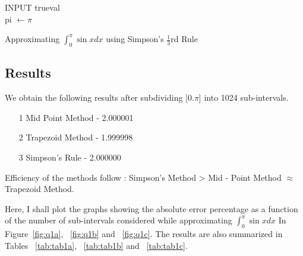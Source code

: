 \documentclass[titlepage, 11pt]{article}
\begin{document}
\begin{center}
\begin{algorithm}[H]\label{alg3}

\SetAlgoLined

INPUT trueval \\ 
pi $\gets \pi$ \\

 \caption{Approximating  $\int_{0}^{\pi} \sin{x} dx$ using Simpson's $\frac{1}{3}$rd Rule}
\end{algorithm}    
\end{center}

\subsection{Results}

We obtain the following results after subdividing [0.$\pi$] into 1024 sub-intervals. 
\begin{itemize}
    \item [1] Mid Point Method - 2.000001
    \item [2] Trapezoid Method - 1.999998
    \item [3] Simpson's Rule - 2.000000
\end{itemize}

Efficiency of the methods follow : Simpson's Method > Mid - Point Method $\approx$ Trapezoid Method.

Here, I shall plot the graphs showing the absolute error percentage as a function of the number of sub-intervals considered while approximating $\int_{0}^{\pi} \sin{x} dx$ In Figure~\ref{fig:q1a}, ~\ref{fig:q1b} and ~\ref{fig:q1c}. The results are also summarized in Tables ~\ref{tab:tab1a}, ~\ref{tab:tab1b} and ~\ref{tab:tab1c}.
\end{document}
